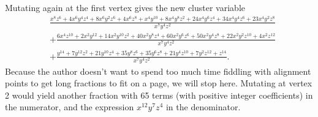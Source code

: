 \documentclass{article}
\begin{document}
\begin{example}
	Mutating again at the first vertex gives the new cluster variable
	\begin{align*}
		 & \frac{x^{8} z^{6} + 4 x^{6} y^{4} z^{4} + 8 x^{6} y^{2} z^{6} + 4 x^{6} z^{8} + x^{4} y^{10} + 8 x^{4} y^{8} z^{2} + 24 x^{4} y^{6} z^{4} + 34 x^{4} y^{4} z^{6} + 23 x^{4} y^{2} z^{8}}{x^7y^4z^2} \\&+ \frac{6 x^{4} z^{10} + 2 x^{2} y^{12} + 14 x^{2} y^{10} z^{2} + 40 x^{2} y^{8} z^{4} + 60 x^{2} y^{6} z^{6} + 50 x^{2} y^{4} z^{8} + 22 x^{2} y^{2} z^{10} + 4 x^{2} z^{12}}{x^7 y^4 z^2}\\ &+ \frac{y^{14} + 7 y^{12} z^{2} + 21 y^{10} z^{4} + 35 y^{8} z^{6} + 35 y^{6} z^{8} + 21 y^{4} z^{10} + 7 y^{2} z^{12} + z^{14}}{x^{7} y^{4} z^{2}}.
	\end{align*}
	Because the author doesn't want to spend too much time fiddling with alignment points
	to get long fractions to fit on a page, we will stop here. Mutating at vertex 2 would
	yield another fraction with 65 terms (with positive integer coefficients) in the
	numerator, and the expression $x^{12}y^7z^4$ in the denominator.
\end{example}
\end{document}
